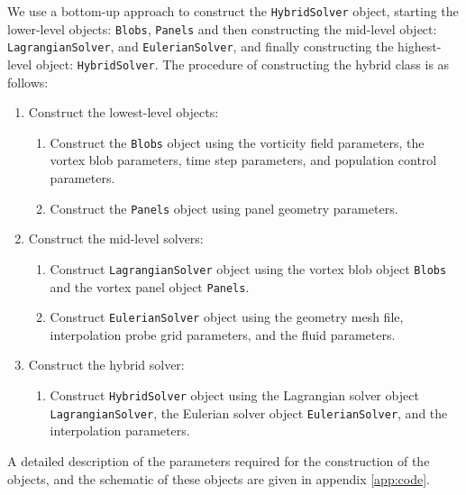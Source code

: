 We use a bottom-up approach to construct the \texttt{HybridSolver} object, starting the lower-level objects: \texttt{Blobs}, \texttt{Panels} and then constructing the mid-level object: \\ \texttt{LagrangianSolver}, and \texttt{EulerianSolver}, and finally constructing the highest-level object: \texttt{HybridSolver}. The procedure of constructing the hybrid class is as follows:
\begin{enumerate}
	\item Construct the lowest-level objects:
		\begin{enumerate}
		\item Construct the \texttt{Blobs} object using the vorticity field parameters, the vortex blob parameters, time step parameters, and population control parameters.
		\item Construct the \texttt{Panels} object using panel geometry parameters.
		\end{enumerate}

	\item Construct the mid-level solvers:
		\begin{enumerate}
		\item Construct \texttt{LagrangianSolver} object using the vortex blob object \texttt{Blobs} and the vortex panel object \texttt{Panels}.
		\item Construct \texttt{EulerianSolver} object using the geometry mesh file, interpolation probe grid parameters, and the fluid parameters.
		\end{enumerate}
		
	\item Construct the hybrid solver:
		\begin{enumerate}
		\item Construct \texttt{HybridSolver} object using the Lagrangian solver object \\ \texttt{LagrangianSolver}, the Eulerian solver object \texttt{EulerianSolver}, and the interpolation parameters.
		\end{enumerate}

\end{enumerate}		

A detailed description of the parameters required for the construction of the objects, and the schematic of these objects are given in appendix \ref{app:code}.